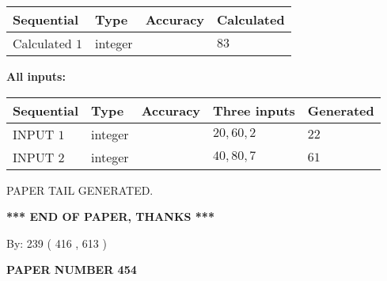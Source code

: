 \documentclass[12pt]{article}
\begin{document}
   
   
   
\noindent{}
   
   
  
  
\noindent\begin{tabular}{|l|l|l|l|}
\hline
 Sequential & Type & Accuracy & Calculated \\ 
\hline
 
 
  Calculated $  1 $ & integer &  & 
  $ 83 $ 
 \\  \hline  
 \end{tabular}
   
   
   
   
\noindent\vspace{0.1in}\hspace{-0.08in} {\textbf{\Large{All inputs: }}}
   
   
  
  
\noindent\begin{tabular}{|l|l|l|l|l|}
\hline
 Sequential & Type & Accuracy & Three inputs & Generated \\ 
\hline
 
 
  INPUT $  1 $ & integer &  & $
 20
 , 
 60
 , 
 2
 $ & $ 22 $ 
 \\  \hline  
 
 
  INPUT $  2 $ & integer &  & $
 40
 , 
 80
 , 
 7
 $ & $ 61 $ 
 \\  \hline  
 \end{tabular}
   
   
   
   
   
   
 \vspace{0.2in}
 
   
   
\vspace{2.0in} PAPER TAIL GENERATED.
   
   
   
   
\vspace{1.0in} 
{\textbf{\large{ *** END OF PAPER, THANKS *** }}} 
   
   
\hspace{1.0in} By: 
 239 ( 416 ,  613 )
   
   
   
   
\newpage 
\setcounter{page}{ 
   454001 } 
   
   
   
   
 {\textbf{ \Large{ PAPER NUMBER  454  }}}
   
\end{document}
